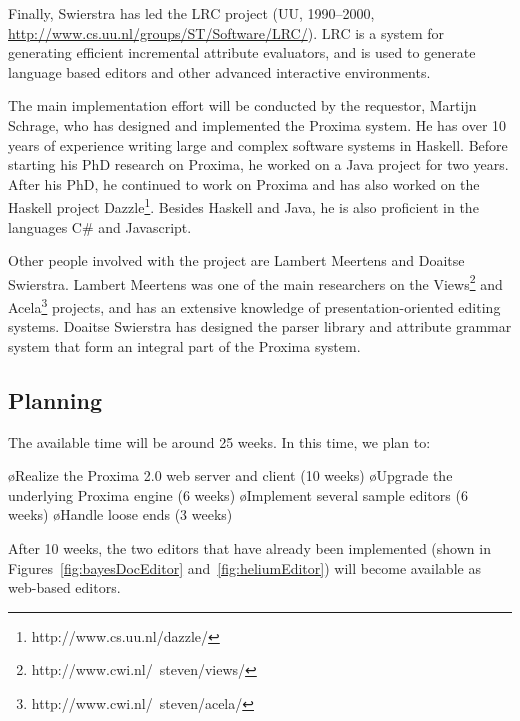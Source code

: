 \documentclass[10pt]{article}
\begin{document}
Finally, Swierstra has led the LRC project (UU, 1990--2000, 
\url{http://www.cs.uu.nl/groups/ST/Software/LRC/}). LRC is a system for generating 
efficient incremental attribute evaluators, and is used to generate 
language based editors and other advanced interactive environments.
\ec

The main implementation effort will be conducted by the requestor, Martijn Schrage, who has designed and implemented the Proxima system. He has over 10 years of experience writing large and complex software systems in Haskell. Before starting his PhD research on Proxima, he worked on a Java project for two years. After his PhD, he continued to work on Proxima and has also worked on the Haskell project Dazzle\footnote{http://www.cs.uu.nl/dazzle/}. Besides Haskell and Java, he is also proficient in the languages C\# and Javascript.

Other people involved with the project are Lambert Meertens and Doaitse Swierstra. Lambert Meertens was one of the main researchers on the Views\footnote{http://www.cwi.nl/~steven/views/} and Acela\footnote{http://www.cwi.nl/~steven/acela/} projects, and has an extensive knowledge of presentation-oriented editing systems. Doaitse Swierstra has designed the parser library and attribute grammar system that form an integral part of the Proxima system.

\subsection{Planning}

The available time will be around 25 weeks. In this time, we plan to:

\bl
\o Realize the Proxima 2.0 web server and client (10 weeks)
\o Upgrade the underlying Proxima engine (6 weeks)
\o Implement several sample editors (6 weeks)
\o Handle loose ends (3 weeks)
\el

After 10 weeks, the two editors that have already been implemented (shown in Figures~\ref{fig:bayesDocEditor} and~\ref{fig:heliumEditor}) will become available as web-based editors.

\end{document}
